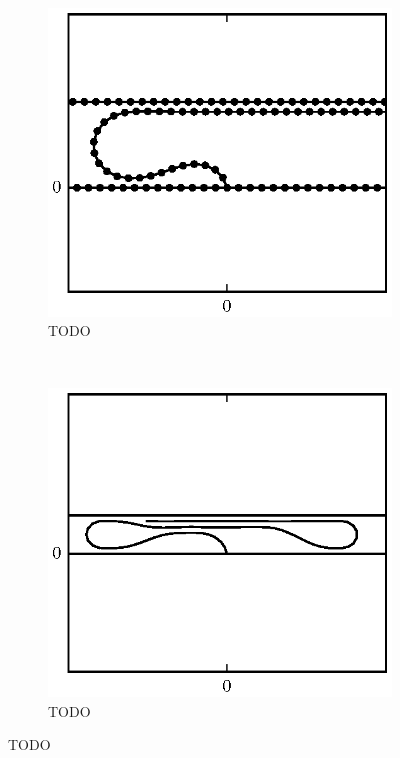 	\begin{figure}
		\centering
		\begin{subfigure}{.5\textwidth}
			\centering
			\includegraphics{./fig/ch3/push/b100/l4.6_m0.65.eps}
			\caption{TODO \label{subfig:push_b100_low_mag}}
		\end{subfigure}%
		~
		\begin{subfigure}{.5\textwidth}
			\centering
			\includegraphics{./fig/ch3/push/b100/l19_m0.eps}
			\caption{TODO \label{subfig:push_b100_high_mag}}
		\end{subfigure}


\end{figure}

